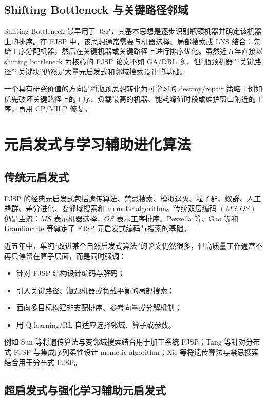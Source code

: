 \documentclass[UTF8,a4paper,11pt]{ctexart}
\begin{document}
\subsection{Shifting Bottleneck 与关键路径邻域}

Shifting Bottleneck 最早用于 JSP，其基本思想是逐步识别瓶颈机器并确定该机器上的排序。在 FJSP 中，该思想通常需要与机器选择、局部搜索或 LNS 结合：先给工序分配机器，然后在关键机器或关键路径上进行排序优化。虽然近五年直接以 shifting bottleneck 为核心的 FJSP 论文不如 GA/DRL 多，但“瓶颈机器”“关键路径”“关键块”仍然是大量元启发式和邻域搜索设计的基础。

一个具有研究价值的方向是将瓶颈思想转化为可学习的 destroy/repair 策略：例如优先破坏关键路径上的工序、负载最高的机器、能耗峰值时段或维护窗口附近的工序，再用 CP/MILP 修复。

\section{元启发式与学习辅助进化算法}

\subsection{传统元启发式}

FJSP 的经典元启发式包括遗传算法、禁忌搜索、模拟退火、粒子群、蚁群、人工蜂群、差分进化、变邻域搜索和 memetic algorithm。传统双层编码 $(MS,OS)$ 仍是主流：$MS$ 表示机器选择，$OS$ 表示工序排序。Pezzella 等、Gao 等和 Brandimarte 等奠定了 FJSP 元启发式编码与搜索的基础\cite{Brandimarte1993,Pezzella2008,Gao2008}。

近五年中，单纯“改进某个自然启发式算法”的论文仍然很多，但高质量工作通常不再只停留在算子层面，而是同时强调：
\begin{itemize}
    \item 针对 FJSP 结构设计编码与解码；
    \item 引入关键路径、瓶颈机器或负载平衡的局部搜索；
    \item 面向多目标构建非支配排序、参考向量或分解机制；
    \item 用 Q-learning/RL 自适应选择邻域、算子或参数。
\end{itemize}

例如 Sun 等将遗传算法与变邻域搜索结合用于加工系统 FJSP\cite{Sun2023HGA}；Tang 等针对分布式 FJSP 与集成序列柔性设计 memetic algorithm\cite{Tang2024DFJSP}；Xie 等将遗传算法与禁忌搜索结合用于分布式 FJSP\cite{Xie2023HGTS}。

\subsection{超启发式与强化学习辅助元启发式}
\end{document}
